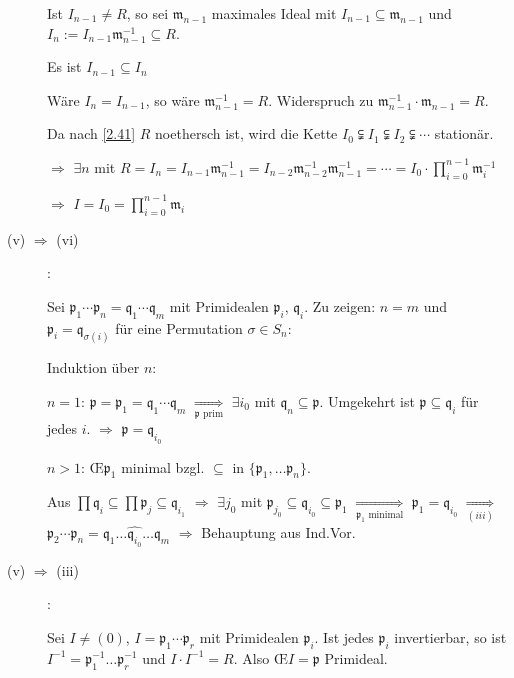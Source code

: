 \begin{Bew}
\begin{description}
Ist $I_{n-1} \neq R$, so sei $\mathfrak{m}_{n-1}$ maximales Ideal mit $I_{n-1} \subseteq \mathfrak{m}_{n-1}$ und $I_n := I_{n-1} \mathfrak{m}_{n-1}^{-1} \subseteq R$.

Es ist $I_{n-1} \subseteq I_n$

W\"are $I_n = I_{n-1}$, so w\"are $\mathfrak{m}_{n-1}^{-1} = R$. Widerspruch zu $\mathfrak{m}_{n-1}^{-1} \cdot \mathfrak{m}_{n-1} = R$.

Da nach \ref{2.41} $R$ noethersch ist, wird die Kette $I_0 \subsetneqq I_1 \subsetneqq I_2 \subsetneqq \cdots$ station\"ar.

$\Rightarrow$ $\exists n$ mit $R = I_n = I_{n-1} \mathfrak{m}_{n-1}^{-1} = I_{n-2} \mathfrak{m}_{n-2}^{-1} \mathfrak{m}_{n-1}^{-1} = \cdots = I_0 \cdot \prod_{i=0}^{n-1} \mathfrak{m}_{i}^{-1}$

$\Rightarrow$ $I = I_0 = \prod_{i=0}^{n-1} \mathfrak{m}_i$

\item[(v) $\Rightarrow$ (vi)]:

Sei $\mathfrak{p}_1 \cdots \mathfrak{p}_n = \mathfrak{q}_1 \cdots \mathfrak{q}_m$ mit Primidealen $\mathfrak{p}_i$, $\mathfrak{q}_i$. Zu zeigen: $n=m$ und $\mathfrak{p}_i = \mathfrak{q}_{\sigma(i)}$ f\"ur eine Permutation $\sigma \in S_n$:

Induktion \"uber $n$:

$n=1$: $\mathfrak{p} = \mathfrak{p}_1 = \mathfrak{q}_1 \cdots \mathfrak{q}_m$ $\underset{\mathfrak{p}\text{ prim}}{\Rightarrow}$ $\exists i_0$ mit $\mathfrak{q}_n \subseteq \mathfrak{p}$. Umgekehrt ist $\mathfrak{p} \subseteq \mathfrak{q}_i$ f\"ur jedes $i$. $\Rightarrow$ $\mathfrak{p} = \mathfrak{q}_{i_0}$

$n>1$: \OE $\mathfrak{p}_1$ minimal bzgl. $\subseteq$ in $\{ \mathfrak{p}_1, \ldots \mathfrak{p}_n \}$.

Aus $\prod \mathfrak{q}_i \subseteq \prod \mathfrak{p}_j \subseteq \mathfrak{q}_{i_1}$ $\Rightarrow$ $\exists j_0$ mit $\mathfrak{p}_{j_0} \subseteq \mathfrak{q}_{i_0} \subseteq \mathfrak{p}_1$ $\underset{\mathfrak{p}_1\text{ minimal}}{\Rightarrow}$ $\mathfrak{p}_1 = \mathfrak{q}_{i_0}$ $\underset{(iii)}{\Rightarrow}$ $\mathfrak{p}_2 \cdots \mathfrak{p}_n = \mathfrak{q}_1 \ldots \widehat{\mathfrak{q}_{i_0}} \ldots \mathfrak{q}_m$ $\Rightarrow$ Behauptung aus Ind.Vor.

\item[(v) $\Rightarrow$ (iii)]:

Sei $I \neq (0)$, $I = \mathfrak{p}_1 \cdots \mathfrak{p}_r$ mit Primidealen $\mathfrak{p}_i$. Ist jedes $\mathfrak{p}_i$ invertierbar, so ist $I^{-1} = \mathfrak{p}_1^{-1} \ldots \mathfrak{p}_r^{-1}$ und $I \cdot I^{-1} = R$. Also \OE $I = \mathfrak{p}$ Primideal.


\end{description}
\end{Bew}
